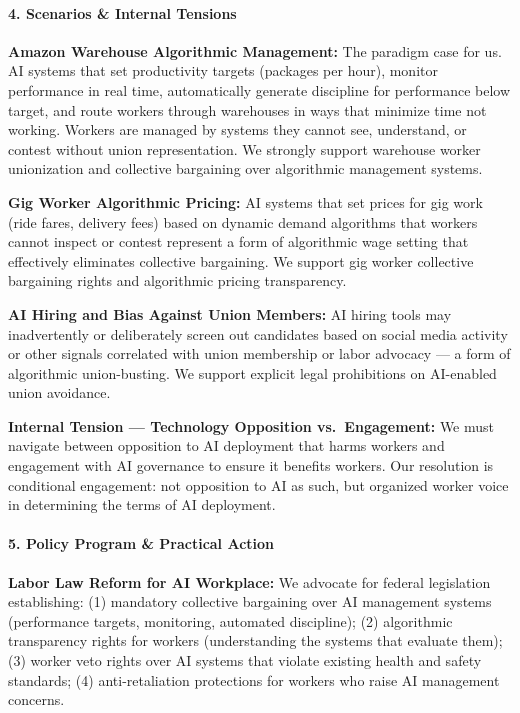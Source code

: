 \paragraph{4. Scenarios \& Internal
Tensions}\label{scenarios-internal-tensions-39}

\textbf{Amazon Warehouse Algorithmic Management:} The paradigm case for
us. AI systems that set productivity targets (packages per hour),
monitor performance in real time, automatically generate discipline for
performance below target, and route workers through warehouses in ways
that minimize time not working. Workers are managed by systems they
cannot see, understand, or contest without union representation. We
strongly support warehouse worker unionization and collective bargaining
over algorithmic management systems.

\textbf{Gig Worker Algorithmic Pricing:} AI systems that set prices for
gig work (ride fares, delivery fees) based on dynamic demand algorithms
that workers cannot inspect or contest represent a form of algorithmic
wage setting that effectively eliminates collective bargaining. We
support gig worker collective bargaining rights and algorithmic pricing
transparency.

\textbf{AI Hiring and Bias Against Union Members:} AI hiring tools may
inadvertently or deliberately screen out candidates based on social
media activity or other signals correlated with union membership or
labor advocacy --- a form of algorithmic union-busting. We support
explicit legal prohibitions on AI-enabled union avoidance.

\textbf{Internal Tension --- Technology Opposition vs.~Engagement:} We
must navigate between opposition to AI deployment that harms workers and
engagement with AI governance to ensure it benefits workers. Our
resolution is conditional engagement: not opposition to AI as such, but
organized worker voice in determining the terms of AI deployment.

\paragraph{5. Policy Program \& Practical
Action}\label{policy-program-practical-action-39}

\textbf{Labor Law Reform for AI Workplace:} We advocate for federal
legislation establishing: (1) mandatory collective bargaining over AI
management systems (performance targets, monitoring, automated
discipline); (2) algorithmic transparency rights for workers
(understanding the systems that evaluate them); (3) worker veto rights
over AI systems that violate existing health and safety standards; (4)
anti-retaliation protections for workers who raise AI management
concerns.

